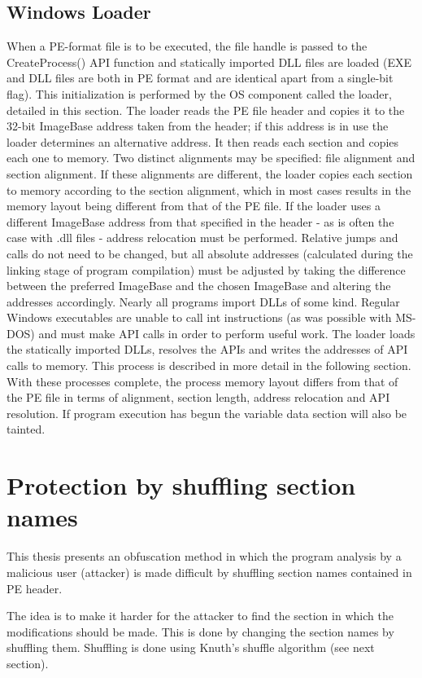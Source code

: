 \documentclass[a4paper,12pt]{article}
\begin{document}
\subsection{Windows Loader}
When a PE-format file is to be executed, the file handle is passed to the
CreateProcess() API function and statically imported DLL files are loaded
(EXE and DLL files are both in PE format and are identical apart from a
single-bit flag). This initialization is performed by the OS component called
the loader, detailed in this section. The loader reads the PE file header and
copies it to the 32-bit ImageBase address taken from the header; if this
address is in use the loader determines an alternative address. It then reads
each section and copies each one to memory. Two distinct alignments may be
specified: file alignment and section alignment. If these alignments are
different, the loader copies each section to memory according to the section
alignment, which in most cases results in the memory layout being different
from that of the PE file. If the loader uses a different ImageBase address
from that specified in the header - as is often the case with .dll files -
address relocation must be performed. Relative jumps and calls do not need to
be changed, but all absolute addresses (calculated during the linking stage
of program compilation) must be adjusted by taking the difference between
the preferred ImageBase and the chosen ImageBase and altering the addresses
accordingly. Nearly all programs import DLLs of some kind. Regular Windows
executables are unable to call int instructions (as was possible with
MS-DOS) and must make API calls in order to perform useful work. The loader
loads the statically imported DLLs, resolves the APIs and writes the
addresses of API calls to memory. This process is described in more detail
in the following section. With these processes complete, the process memory
layout differs from that of the PE file in terms of alignment, section
length, address relocation and API resolution. If program execution has begun
the variable data section will also be tainted.

\section{Protection by shuffling section names}
This thesis presents an obfuscation method in which the program analysis
by a malicious user (attacker) is made difficult by shuffling section names
contained in PE header.

The idea is to make it harder for the attacker to find the section in which
the modifications should be made. This is done by changing the section names
by shuffling them. Shuffling is done using Knuth's shuffle algorithm (see
next section).
\end{document}
